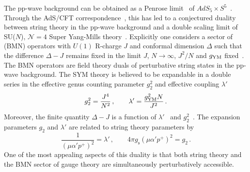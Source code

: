 \documentclass[12pt]{article}
\def\D{\Delta}
\def\a{\alpha}
\def\m{\mu}
\def\mc{\mathcal}
\numberwithin{equation}{section} \setlength{\textwidth}{17cm}
\begin{document}
\noindent The pp-wave background can be obtained as a Penrose limit~\cite{penrose} of
$AdS_5\times S^5$~\cite{bfhp}. Through the AdS/CFT correspondence~\cite{malda,GKP,Witten}, this has 
led to a conjectured duality between string theory in the pp-wave background and
a double scaling limit of SU($N$), ${\mc N}=4$ Super Yang-Mills theory~\cite{bmn}.
Explicitly one considers a sector of (BMN) operators with $U(1)$ R-charge $J$ and
conformal dimension $\D$ such that the difference $\D-J$ remains fixed in
the limit $J$, $N\to\infty$, $J^2/N$ and $g_{\mbox{\scriptsize YM}}$ fixed~\cite{bmn}. 
The BMN operators are field theory duals of perturbative string states in the pp-wave background. 
The SYM theory is believed to be expandable in a double series in the 
effective genus counting parameter $g_2^2$ and 
effective coupling $\lambda'$~\cite{jan,freedman}
\begin{equation}
g_2^2=\frac{J^4}{N^2}\,,\qquad\lambda'=\frac{g^2_{\mbox{\scriptsize YM}}N}{J^2}\,.
\end{equation}
Moreover, the finite quantity $\D-J$ is a function of $\lambda'$~\cite{bmn,gross,sz} 
and $g_2^2$~\cite{jan, freedman}. 
The expansion parameters $g_2$ and $\lambda'$ are related to string theory parameters by~\cite{bmn}
\begin{equation}
\frac{1}{(\m\a'p^+)^2}=\lambda'\,,\qquad 4\pi g_{\text{s}}(\m\a'p^+)^2=g_2\,.
\end{equation}
One of the most appealing aspects of this duality is that both string theory and the BMN sector of gauge theory are 
simultaneously perturbatively accessible.
\end{document}
